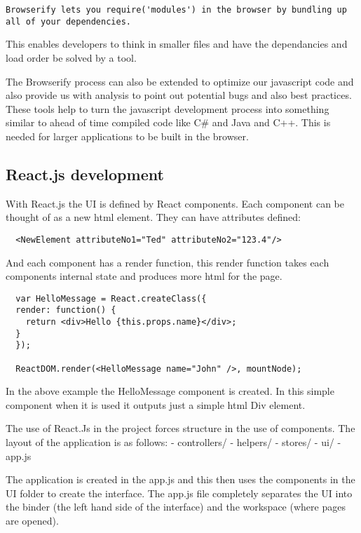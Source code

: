 \begin{verbatim}
Browserify lets you require('modules') in the browser by bundling up all of your dependencies.
\end{verbatim}

This enables developers to think in smaller files and have the
dependancies and load order be solved by a tool.

The Browserify process can also be extended to optimize our javascript
code and also provide us with analysis to point out potential bugs and
also best practices. These tools help to turn the javascript development
process into something similar to ahead of time compiled code like C\#
and Java and C++. This is needed for larger applications to be built in
the browser.

\subsection{React.js development}\label{react.js-development}

With React.js the UI is defined by React components. Each component can
be thought of as a new html element. They can have attributes defined:

\begin{verbatim}
  <NewElement attributeNo1="Ted" attributeNo2="123.4"/>
\end{verbatim}

And each component has a render function, this render function takes
each components internal state and produces more html for the page.

\begin{verbatim}
  var HelloMessage = React.createClass({
  render: function() {
    return <div>Hello {this.props.name}</div>;
  }
  });

  ReactDOM.render(<HelloMessage name="John" />, mountNode);
\end{verbatim}

In the above example the HelloMessage component is created. In this
simple component when it is used it outputs just a simple html Div
element.

The use of React.Js in the project forces structure in the use of
components. The layout of the application is as follows: - controllers/
- helpers/ - stores/ - ui/ - app.js

The application is created in the app.js and this then uses the
components in the UI folder to create the interface. The app.js file
completely separates the UI into the binder (the left hand side of the
interface) and the workspace (where pages are opened).

